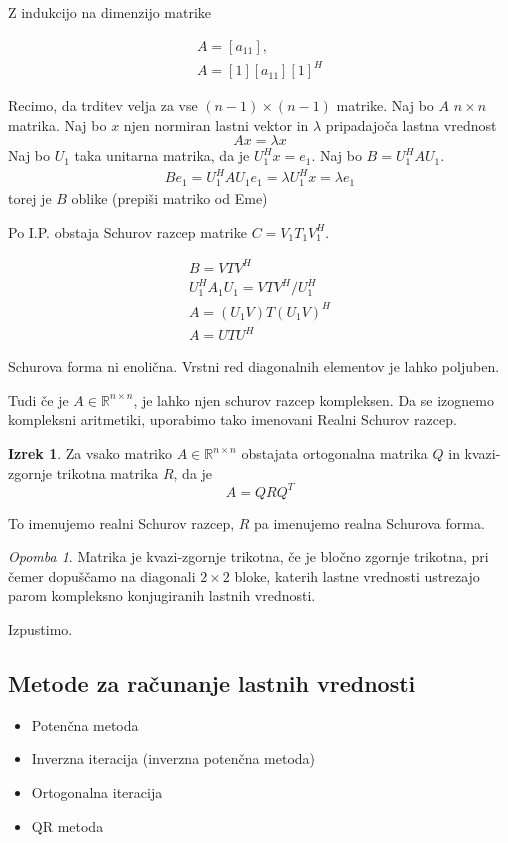 \documentclass[a4paper,12pt]{article}
\theoremstyle{definition}
\newtheorem{theorem}[counter]{Izrek}
\theoremstyle{remark}
\newtheorem*{rem}{Opomba}
\newcommand{\R}{\mathbb{R}}
\begin{document}
\begin{pro}
    Z indukcijo na dimenzijo matrike

    \begin{gather*}
        A = [a_{11}], \\
        A = [1] [a_{11}] [1]^H
    \end{gather*}
    
    Recimo, da trditev velja za vse $(n-1)\times(n-1)$ matrike. Naj bo $A$ $n\times n$ matrika. Naj bo $x$ njen normiran lastni vektor in $\lambda$
    pripadajoča lastna vrednost
    \begin{equation*}
        Ax = \lambda x
    \end{equation*}
    Naj bo $U_1$ taka unitarna matrika, da je $U_1^H x = e_1$. Naj bo $B = U_1^H A U_1$.
    \begin{gather*}
        B e_1 = U_1^H A U_1 e_1 = \lambda U_1^H x = \lambda e_1
    \end{gather*}
    torej je $B$ oblike
    (prepiši matriko od Eme)

    Po I.P. obstaja Schurov razcep matrike $C = V_1 T_1 V_1^H$.

    \begin{gather*}
        B = V T V^H \\
        U_1^H A_1 U_1 = V T V^H /U_1^H \\
        A = (U_1 V) T (U_1 V)^H \\
        A = U T U^H
    \end{gather*}
\end{pro}

Schurova forma ni enolična. Vrstni red diagonalnih elementov je lahko poljuben.

Tudi če je $A \in \R^{n\times n}$, je lahko njen schurov razcep kompleksen. Da se izognemo kompleksni aritmetiki, uporabimo tako imenovani Realni Schurov razcep.

\begin{theorem}
    Za vsako matriko $A \in \R^{n\times n}$ obstajata ortogonalna matrika $Q$ in kvazi-zgornje trikotna matrika $R$, da je
    \begin{equation*}
        A = QRQ^T
    \end{equation*}

    To imenujemo realni Schurov razcep, $R$ pa imenujemo realna Schurova forma.
\end{theorem}

\begin{rem}
    Matrika je kvazi-zgornje trikotna, če je bločno zgornje trikotna, pri čemer dopuščamo na diagonali $2 \times 2$ bloke, katerih lastne vrednosti
    ustrezajo parom kompleksno konjugiranih lastnih vrednosti.
\end{rem}

\begin{pro}
    Izpustimo.
\end{pro}

\subsection{Metode za računanje lastnih vrednosti}
\begin{itemize}
    \item Potenčna metoda
    \item Inverzna iteracija (inverzna potenčna metoda)
    \item Ortogonalna iteracija
    \item QR metoda
\end{itemize}
\end{document}
